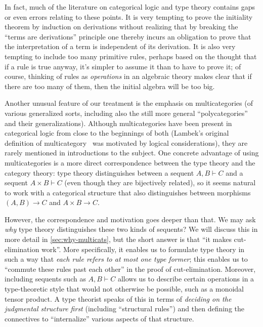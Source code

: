 \documentclass{book}
\let\types\vdash
\begin{document}
In fact, much of the literature on categorical logic and type theory contains gaps or even errors relating to these points.
It is very tempting to prove the initiality theorem by induction on derivations without realizing that by breaking the ``terms are derivations'' principle one thereby incurs an obligation to prove that the interpretation of a term is independent of its derivation.
It is also very tempting to include too many primitive rules, perhaps based on the thought that if a rule is true anyway, it's simpler to assume it than to have to prove it; of course, thinking of rules as \emph{operations} in an algebraic theory makes clear that if there are too many of them, then the initial algebra will be too big.

Another unusual feature of our treatment is the emphasis on multicategories (of various generalized sorts, including also the still more general ``polycategories'' and their generalizations).
Although multicategories have been present in categorical logic from close to the beginnings of both (Lambek's original definition of multicategory~\cite{lambek:dedsys-ii} was motivated by logical considerations), they are rarely mentioned in introductions to the subject.
One concrete advantage of using multicategories is a more direct correspondence between the type theory and the category theory: type theory distinguishes between a sequent $A,B\types C$ and a sequent $A\times B\types C$ (even though they are bijectively related), so it seems natural to work with a categorical structure that also distinguishes between morphisms $(A,B)\to C$ and $A\times B\to C$.

However, the correspondence and motivation goes deeper than that.
We may ask \emph{why} type theory distinguishes these two kinds of sequents?
We will discuss this in more detail in \cref{sec:why-multicats}, but the short answer is that ``it makes cut-elimination work''.
More specifically, it enables us to formulate type theory in such a way that \emph{each rule refers to at most one type former}; this enables us to ``commute these rules past each other'' in the proof of cut-elimination.
Moreover, including sequents such as $A,B\types C$ allows us to describe certain operations in a type-theoretic style that would not otherwise be possible, such as a monoidal tensor product.
A type theorist speaks of this in terms of \emph{deciding on the judgmental structure first} (including ``structural rules'') and then defining the connectives to ``internalize'' various aspects of that structure.
\end{document}
